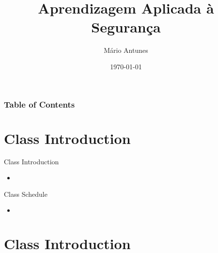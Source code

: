 \documentclass{beamer}
\title{Aprendizagem Aplicada à Segurança}
\date{\today}
\author{Mário Antunes}
\institute{University of Aveiro}
\begin{document}
  \maketitle

  \begin{frame}
    \frametitle{Table of Contents}
    \tableofcontents
  \end{frame}

  \section{Class Introduction}
  \begin{frame}{Class Introduction}
    \begin{itemize}
      \item 
    \end{itemize}  
  \end{frame}

  \begin{frame}{Class Schedule}
    \begin{itemize}
      \item 
    \end{itemize}  
  \end{frame}

  \section{Class Introduction}
\end{document}
